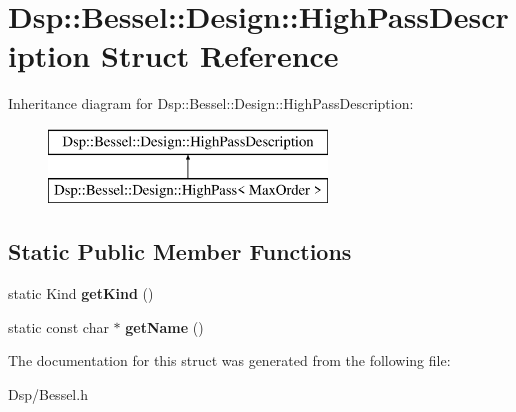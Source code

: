 \hypertarget{structDsp_1_1Bessel_1_1Design_1_1HighPassDescription}{\section{Dsp\-:\-:Bessel\-:\-:Design\-:\-:High\-Pass\-Description Struct Reference}
\label{structDsp_1_1Bessel_1_1Design_1_1HighPassDescription}
}
Inheritance diagram for Dsp\-:\-:Bessel\-:\-:Design\-:\-:High\-Pass\-Description\-:\begin{figure}[H]
\begin{center}
\leavevmode
\includegraphics[height=2.000000cm]{structDsp_1_1Bessel_1_1Design_1_1HighPassDescription}
\end{center}
\end{figure}
\subsection*{Static Public Member Functions}
\begin{DoxyCompactItemize}
\item 
\hypertarget{structDsp_1_1Bessel_1_1Design_1_1HighPassDescription_ad506579436544e81a524e95a71cd7dbf}{static Kind {\bfseries get\-Kind} ()}\label{structDsp_1_1Bessel_1_1Design_1_1HighPassDescription_ad506579436544e81a524e95a71cd7dbf}

\item 
\hypertarget{structDsp_1_1Bessel_1_1Design_1_1HighPassDescription_afb53a3204390b04a6c75b651f5b30026}{static const char $\ast$ {\bfseries get\-Name} ()}\label{structDsp_1_1Bessel_1_1Design_1_1HighPassDescription_afb53a3204390b04a6c75b651f5b30026}

\end{DoxyCompactItemize}


The documentation for this struct was generated from the following file\-:\begin{DoxyCompactItemize}
\item 
Dsp/Bessel.\-h\end{DoxyCompactItemize}
